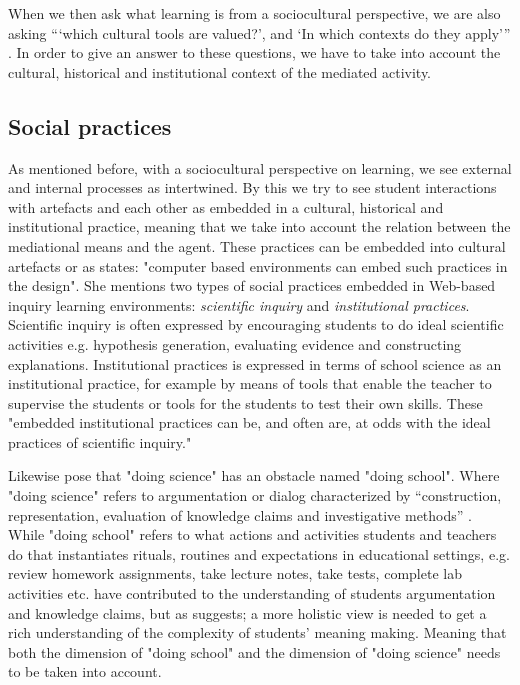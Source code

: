 When we then ask what learning is from a sociocultural perspective, we are also asking “‘which cultural tools are valued?’, and ‘In which contexts do they apply’” \citep{mifsud2010reconsidering}. In order to give an answer to these questions, we have to take into account the cultural, historical and institutional context of the mediated activity. 

\subsection{Social practices}
As mentioned before, with a sociocultural perspective on learning, we see external and internal processes as intertwined. By this we try to see student interactions with artefacts and each other as embedded in a cultural, historical and institutional practice, meaning that we take into account the relation between the mediational means and the agent. These practices can be embedded into cultural artefacts or as \citet{furberg2009socio} states: "computer based environments can embed such practices in the design". She mentions two types of social practices embedded in Web-based inquiry learning environments: \emph{scientific inquiry} and \emph{institutional practices}.  Scientific inquiry is often expressed by encouraging students to do ideal scientific activities e.g. hypothesis generation, evaluating evidence and constructing explanations. Institutional practices is expressed in terms of school science as an institutional practice, for example by means of tools that enable the teacher to supervise the students or tools for the students to test their own skills. These "embedded institutional practices can be, and often are, at odds with the ideal practices of scientific inquiry." \citetext{\citealp{chinn2002epistemologically}, referenced in \citealp{furberg2009socio}} 

Likewise \citet{jimenez2000doing} pose that "doing science" has an obstacle named "doing school". Where "doing science" refers to argumentation or dialog characterized by “construction, representation, evaluation of knowledge claims and investigative methods” \citep{jimenez2000doing}. While "doing school" refers to what actions and activities students and teachers do that instantiates rituals, routines and expectations in educational settings, e.g. review homework assignments, take lecture notes, take tests, complete lab activities etc. \citeauthor{jimenez2000doing} have contributed to the understanding of students argumentation and knowledge claims, but as \citet*{furberg2008students} suggests; a more holistic view is needed to get a rich understanding of the complexity of students' meaning making. Meaning that both the dimension of "doing school" and the dimension of "doing science" needs to be taken into account. 

